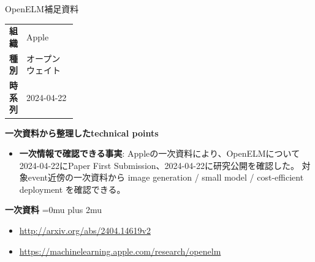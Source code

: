 \Needspace{0.38\textheight}
\begin{technicalnote}{OpenELM}{補足資料}
\begingroup
\begin{tabularx}{\linewidth}{@{}>{\bfseries}p{0.22\linewidth}X@{}}
組織 & Apple \\
種別 & オープンウェイト \\
時系列 & 2024-04-22 \\
\end{tabularx}
\smallskip
\begin{minipage}{\linewidth}
{\bfseries 一次資料から整理したtechnical points}
\begin{itemize}[leftmargin=1.5em,itemsep=0.35em]
\item \textbf{一次情報で確認できる事実}: Appleの一次資料により、OpenELMについて2024-04-22にPaper First Submission、2024-04-22に研究公開を確認した。 対象event近傍の一次資料から image generation / small model / cost-efficient deployment を確認できる。
\end{itemize}
\begin{minipage}{\linewidth}
\begin{samepage}
{\bfseries 一次資料}
\begingroup\sloppy
\Urlmuskip=0mu plus 2mu\relax
\begin{itemize}[leftmargin=1.5em,itemsep=0.25em]
\item {\scriptsize\url{http://arxiv.org/abs/2404.14619v2}}
\item {\scriptsize\url{https://machinelearning.apple.com/research/openelm}}
\end{itemize}
\endgroup
\end{samepage}
\end{minipage}
\end{minipage}
\endgroup
\end{technicalnote}
\medskip
